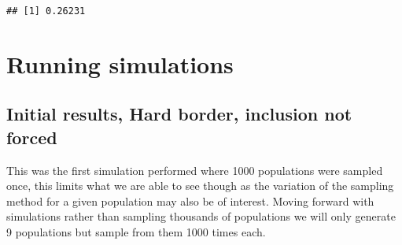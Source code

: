 \documentclass[
]{article}
\newenvironment{Shaded}{\begin{snugshade}}{\end{snugshade}}
\newcommand{\AttributeTok}[1]{\textcolor[rgb]{0.13,0.29,0.53}{#1}}
\newcommand{\ControlFlowTok}[1]{\textcolor[rgb]{0.13,0.29,0.53}{\textbf{#1}}}
\newcommand{\DecValTok}[1]{\textcolor[rgb]{0.00,0.00,0.81}{#1}}
\newcommand{\FunctionTok}[1]{\textcolor[rgb]{0.13,0.29,0.53}{\textbf{#1}}}
\newcommand{\NormalTok}[1]{#1}
\newcommand{\OtherTok}[1]{\textcolor[rgb]{0.56,0.35,0.01}{#1}}
\newcommand{\SpecialCharTok}[1]{\textcolor[rgb]{0.81,0.36,0.00}{\textbf{#1}}}
\begin{document}
\begin{Shaded}
\end{Shaded}

\begin{verbatim}
## [1] 0.26231
\end{verbatim}

\section{Running simulations}\label{running-simulations}

\subsection{Initial results, Hard border, inclusion not
forced}\label{initial-results-hard-border-inclusion-not-forced}

This was the first simulation performed where 1000 populations were
sampled once, this limits what we are able to see though as the
variation of the sampling method for a given population may also be of
interest. Moving forward with simulations rather than sampling thousands
of populations we will only generate 9 populations but sample from them
1000 times each.
\end{document}
